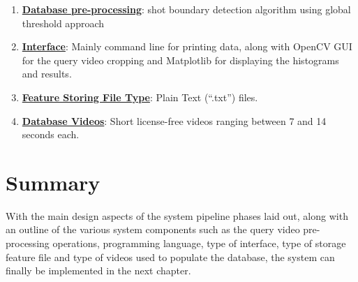 \begin{enumerate}
    \item \underline{\textbf{Database pre-processing}}: shot boundary detection algorithm using global threshold approach
    
    \item \underline{\textbf{Interface}}: Mainly command line for printing data, along with OpenCV GUI for the query video cropping and Matplotlib for displaying the histograms and results.
    
    \item \underline{\textbf{Feature Storing File Type}}: Plain Text (``.txt'') files.
    
    \item \underline{\textbf{Database Videos}}: Short license-free videos ranging between 7 and 14 seconds each.

\end{enumerate}


\section{Summary}

With the main design aspects of the system pipeline phases laid out, along with an outline of the various system components such as the query video pre-processing operations, programming language, type of interface, type of storage feature file and type of videos used to populate the database, the system can finally be implemented in the next chapter.
